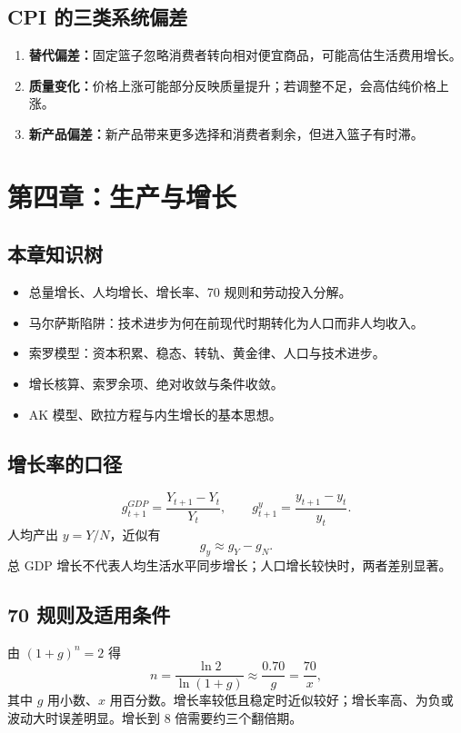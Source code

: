 \documentclass[UTF8,11pt,a4paper]{ctexart}
\newcommand{\term}[1]{\textbf{#1}}
\begin{document}
\subsection{CPI 的三类系统偏差}
\begin{enumerate}
  \item \term{替代偏差：}固定篮子忽略消费者转向相对便宜商品，可能高估生活费用增长。
  \item \term{质量变化：}价格上涨可能部分反映质量提升；若调整不足，会高估纯价格上涨。
  \item \term{新产品偏差：}新产品带来更多选择和消费者剩余，但进入篮子有时滞。
\end{enumerate}

\newpage
\section{第四章：生产与增长}

\subsection{本章知识树}
\begin{itemize}
  \item 总量增长、人均增长、增长率、70 规则和劳动投入分解。
  \item 马尔萨斯陷阱：技术进步为何在前现代时期转化为人口而非人均收入。
  \item 索罗模型：资本积累、稳态、转轨、黄金律、人口与技术进步。
  \item 增长核算、索罗余项、绝对收敛与条件收敛。
  \item AK 模型、欧拉方程与内生增长的基本思想。
\end{itemize}

\subsection{增长率的口径}
\[
g^{GDP}_{t+1}=\frac{Y_{t+1}-Y_t}{Y_t},
\qquad
g^y_{t+1}=\frac{y_{t+1}-y_t}{y_t}.
\]
人均产出 $y=Y/N$，近似有
\[
g_y\approx g_Y-g_N.
\]
总 GDP 增长不代表人均生活水平同步增长；人口增长较快时，两者差别显著。

\subsection{70 规则及适用条件}
由 $(1+g)^n=2$ 得
\[
n=\frac{\ln2}{\ln(1+g)}\approx\frac{0.70}{g}=\frac{70}{x},
\]
其中 $g$ 用小数、$x$ 用百分数。增长率较低且稳定时近似较好；增长率高、为负或波动大时误差明显。增长到 8 倍需要约三个翻倍期。
\end{document}
